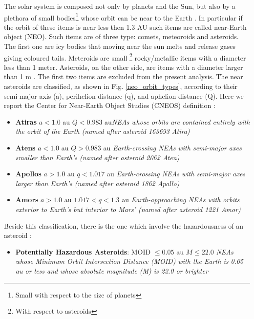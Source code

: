 \documentclass[12pt,%
               a4paper,%
               oneside,openany,%
               titlepage,%
               headinclude,footinclude,%
               BCOR5mm,%
               cleardoublepage=empty,%
               tablecaptionabove,%
               floatperchapter,
               ]{scrreprt}                 %
\begin{document}
The solar system is composed not only by planets and the Sun, but also by a plethora of small bodies\footnote{Small with respect to the size of planets} whose orbit can be near to the Earth \cite{burbine2016asteroids}. In particular if the orbit of these items is near less then 1.3 AU such items are called near-Earth object (NEO). Such items are of three type: comets, meteoroids and asteroids. The first one are icy bodies that moving near the sun melts and release gases giving coloured tails. Meteroids are small \footnote{With respect to asteroids} rocky/metallic items with a diameter less than 1 meter. Asteroids, on the other side, are items with a diameter larger than 1 m \cite{burbine2016asteroids}. The first two items are excluded from the present analysis.  
The near asteroids are classified, as shown in Fig. \ref{neo_orbit_types}, according to their semi-major axis (a), perihelion distance (q), and aphelion distance (Q). Here we report the Center for Near-Earth Object Studies (CNEOS) definition \cite{nasa_classification}:

\begin{itemize}
\item \textbf{Atiras} $a < 1.0$ au $Q < 0.983$ au\quad \textit{NEAs whose orbits are contained entirely with the orbit of the Earth (named after asteroid 163693 Atira)}
\item \textbf{Atens} $a < 1.0$ au $Q > 0.983$ au \quad \textit{Earth-crossing NEAs with semi-major axes smaller than Earth's (named after asteroid 2062 Aten)}
\item \textbf{Apollos} $a>1.0$ au $q<1.017$ au \quad  \textit{Earth-crossing NEAs with semi-major axes larger than Earth's (named after asteroid 1862 Apollo) }
\item \textbf{Amors} $a>1.0$ au $1.017<q<1.3$ au \textit{Earth-approaching NEAs with orbits exterior to Earth's but interior to Mars' (named after asteroid 1221 Amor)}
\end{itemize}

Beside this classification, there is the one which involve the hazardousness of an asteroid \cite{nasa_classification}:

\begin{itemize}
\item \textbf{Potentially Hazardous Asteroids}: MOID $\leq 0.05$ au $M \leq22.0$ \textit{NEAs whose Minimum Orbit Intersection Distance (MOID) with the Earth is 0.05 au or less and whose absolute magnitude (M) is 22.0 or brighter}
\end{itemize}
\end{document}
